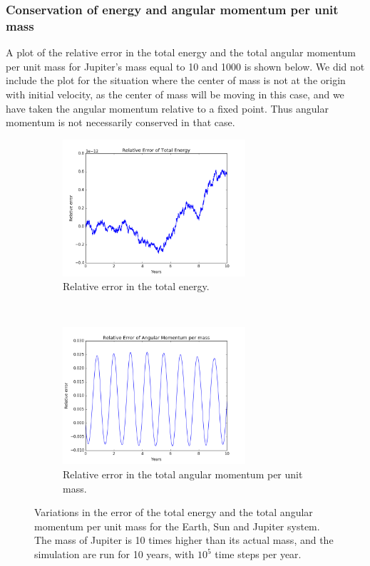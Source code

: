 \documentclass[a4paper, 10pt]{article}
\begin{document}
\subsubsection{Conservation of energy and angular momentum per unit mass}
A plot of the relative error in the total energy and the total angular momentum per unit mass for Jupiter's mass equal to 10 and 1000 is shown below. We did not include the plot for the situation where the center of mass is not at the origin with initial velocity, as the center of mass will be moving in this case, and we have taken the angular momentum relative to a fixed point. Thus angular momentum is not necessarily conserved in that case.
\begin{figure}[!ht]
    \centering
    \begin{subfigure}[H!]{0.5\textwidth}
        \centering
        \includegraphics[height=2.0in]{relErrEnSEJx10.png}
        \caption{Relative error in the total energy.}
    \end{subfigure}%
    ~ 
    \begin{subfigure}[H!]{0.5\textwidth}
        \centering
        \includegraphics[height=2.0in]{relErrMomSEJx10.png}
        \caption{Relative error in the total angular momentum per unit mass.}
    \end{subfigure}
    \caption{Variations in the error of the total energy and the total angular momentum per unit mass for the Earth, Sun and Jupiter system. The mass of Jupiter is 10 times higher than its actual mass, and the simulation are run for 10 years, with $10^5$ time steps per year.}\label{fig:Energy_jupiter_10}
\end{figure}
\end{document}
